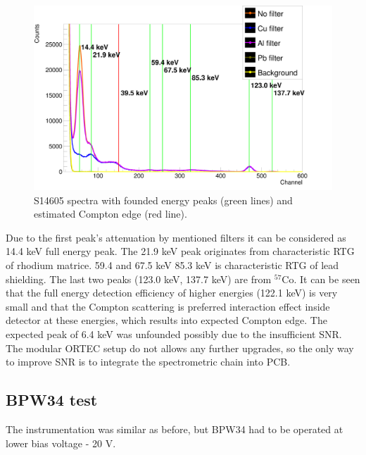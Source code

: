 \begin{figure}[H]
 \centering
 \includegraphics[scale=0.125, angle = 0]{./pictures/S14GammaTest.png}
 \caption{S14605 spectra with founded energy peaks (green lines) and estimated Compton edge (red line).}
 \label{S14605 spectra}
 
\end{figure}


\par

Due to the first peak's attenuation by mentioned filters it can be considered as 14.4 keV full energy peak. The 21.9 keV peak originates from characteristic RTG of rhodium matrice. 59.4 and 67.5 keV 85.3 keV is characteristic RTG of lead shielding. The last two peaks (123.0 keV, 137.7 keV) are from $^{57}$Co. It can be seen that the full energy detection efficiency of higher energies (122.1 keV) is very small and that the Compton scattering is preferred interaction effect inside detector at these energies, which results into expected Compton edge. The expected peak of 6.4 keV was unfounded possibly due to the insufficient SNR. The modular ORTEC setup do not allows any further upgrades, so the only way to improve SNR is to integrate the spectrometric chain into PCB. 

\subsection{BPW34 test}
The instrumentation was similar as before, but BPW34 had to be operated at lower bias voltage - 20 V.

